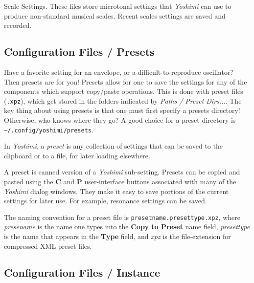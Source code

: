    Scale Settings.  These files store microtonal settings that \textsl{Yoshimi}
   can use to produce non-standard musical scales.  Recent scales settings are
   saved and recorded.

\subsection{Configuration Files / Presets}
\label{subsec:configuration_preset}

   Have a favorite setting for an envelope, or a difficult-to-reproduce
   oscillator? Then presets are for you! Presets allow for one to save the
   settings for any of the components which support copy/paste operations.
   This is done with preset files (\texttt{.xpz}), which get stored in the
   folders indicated by \textsl{Paths / Preset Dirs...}.
   The key thing about using presets is that one must first
   specify a presets directory!  Otherwise, who knows where they go?
   A good choice for a preset directory is
   \texttt{\textasciitilde/.config/yoshimi/presets}.

   In \textsl{Yoshimi}, a
   \textsl{preset} is any collection of settings that can be saved to the
   clipboard or to a file, for later loading elsewhere.

   A preset is canned version of a \textsl{Yoshimi} sub-setting.  Presets can be
   copied and pasted using the \textbf{C} and \textbf{P} user-interface buttons
   associated with many of the \textsl{Yoshimi} dialog windows.  They make it
   easy to save portions of the current settings for later use.  For example,
   resonance settings can be saved.

   The naming convention for a preset file is
   \texttt{presetname.presettype.xpz}, where
   \textsl{presename} is the name one types into the \textbf{Copy to Preset}
   name field, \textsl{presettype} is the name that appears in the
   \textbf{Type} field, and \textsl{xpz} is the file-extension for compressed
   XML preset files.


\subsection{Configuration Files / Instance}
\label{subsec:configuration_instance}

